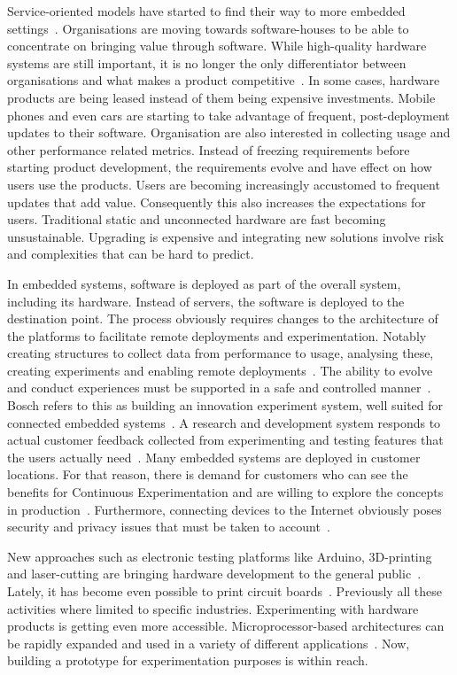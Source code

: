 \documentclass[english]{tktltiki2}
\begin{document}
Service-oriented models have started to find their way to more embedded settings~\cite{BE12, Bos12}. Organisations are moving towards software-houses to be able to concentrate on bringing value through software. While high-quality hardware systems are still important, it is no longer the only differentiator between organisations and what makes a product competitive~\cite{EHS14}. In some cases, hardware products are being leased instead of them being expensive investments. Mobile phones and even cars are starting to take advantage of frequent, post-deployment updates to their software. Organisation are also interested in collecting usage and other performance related metrics. Instead of freezing requirements before starting product development, the requirements evolve and have effect on how users use the products. Users are becoming increasingly accustomed to frequent updates that add value. Consequently this also increases the expectations for users. Traditional static and unconnected hardware are fast becoming unsustainable. Upgrading is expensive and integrating new solutions involve risk and complexities that can be hard to predict.

In embedded systems, software is deployed as part of the overall system, including its hardware. Instead of servers, the software is deployed to the destination point. The process obviously requires changes to the architecture of the platforms to facilitate remote deployments and experimentation. Notably creating structures to collect data from performance to usage, analysing these, creating experiments and enabling remote deployments~\cite{BE12}. The ability to evolve and conduct experiences must be supported in a safe and controlled manner~\cite{BE12}. Bosch refers to this as building an innovation experiment system, well suited for connected embedded systems~\cite{BE12, Bos12}. A research and development system responds to actual customer feedback collected from experimenting and testing features that the users actually need~\cite{HAB12}. Many embedded systems are deployed in customer locations. For that reason, there is demand for customers who can see the benefits for Continuous Experimentation and are willing to explore the concepts in production~\cite{HAB12}. Furthermore, connecting devices to the Internet obviously poses security and privacy issues that must be taken to account~\cite{BE12}.

New approaches such as electronic testing platforms like Arduino, 3D-printing and laser-cutting are bringing hardware development to the general public~\cite{Arduino}. Lately, it has become even possible to print circuit boards~\cite{Vol15}. Previously all these activities where limited to specific industries. Experimenting with hardware products is getting even more accessible. Microprocessor-based architectures can be rapidly expanded and used in a variety of different applications~\cite{KRM13}. Now, building a prototype for experimentation purposes is within reach.
\end{document}
